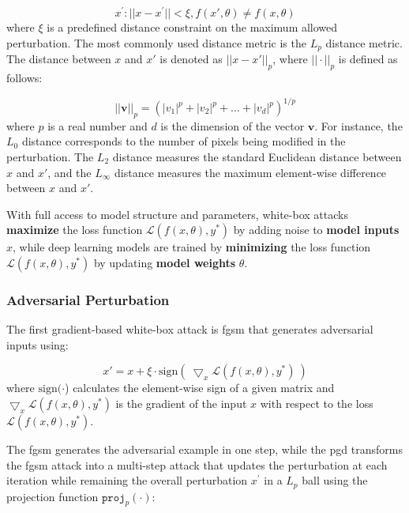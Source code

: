\begin{equation}
x^{'}: ||x - x^{'}|| < \xi, f(x', \theta) \neq f(x, \theta)
\end{equation}
where $ \xi$ is a predefined distance constraint on the maximum allowed perturbation. The most commonly used distance metric is the $L_p$ distance metric. The distance between $x$ and $x'$ is denoted as $||x-x'||_{p}$, where $||\cdot||_p$ is defined as follows:

\begin{equation}
 ||\textbf{v}||_p = (|v_1|^p + |v_2|^p + \dots + |v_d|^p)^{1/p}
\end{equation}
where $p$ is a real number and $d$ is the dimension of the vector $\textbf{v}$. For instance, the $L_0$ distance corresponds to the number of pixels being modified in the perturbation. The $L_2$ distance measures the standard Euclidean distance between $x$ and $x'$, and the $L_\infty$ distance measures the maximum element-wise difference between $x$ and $x'$.

With full access to model structure and parameters, white-box attacks \textbf{maximize} the loss function $\mathcal{L}(f(x, \theta), y^*)$ by adding noise to \textbf{ model inputs} $x$, while deep learning models are trained by \textbf{minimizing} the loss function $\mathcal{L}(f(x, \theta), y^*)$ by updating \textbf{ model weights} $\theta$.

\subsubsection{Adversarial Perturbation}

The first gradient-based white-box attack is \acrfull{fgsm} \citep{GoodfellowSS14} that generates adversarial inputs using:

\begin{equation}
x' = x + \xi \cdot \text{sign}(\ \bigtriangledown_x \mathcal{L}(f(x, \theta), y^*)\ )    
\end{equation} 
where $\text{sign}(\cdot$) calculates the element-wise sign of a given matrix and $\bigtriangledown_x \mathcal{L}(f(x, \theta), y^*)$ is the gradient of the input $x$ with respect to the loss $\mathcal{L}(f(x, \theta), y^*)$.

The \acrshort{fgsm} generates the adversarial example in one step, while the \acrfull{pgd} \citep{madry2017towards} transforms the \acrshort{fgsm} attack into a multi-step attack that updates the perturbation at each iteration while remaining the overall perturbation $x^{'}$ in a $L_p$ ball using the projection function $\texttt{proj}_{p}(\cdot)$:

